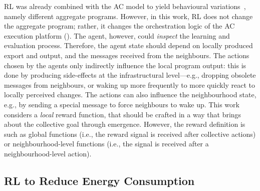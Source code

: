 \ac{RL} was already combined with the \ac{AC} model 
 to yield behavioural variations~\cite{DBLP:conf/acsos/Aguzzi21}, namely different aggregate programs.
%
However, in this work, \ac{RL} does not change the aggregate program; 
 rather, it changes the orchestration logic of the \ac{AC} execution platform (). 
%
The agent, however, could \emph{inspect} the learning and evaluation process. 
 Therefore, the agent state should depend on locally produced export and output, 
 and the messages received from the neighbours.
%
The actions chosen by the agents only indirectly influence the local program output: 
 this is done by producing side-effects at the infrastructural level---e.g., 
 dropping obsolete messages from neighbours, 
 or waking up more frequently to more quickly 
 react to locally perceived changes.
%
The actions can also influence the neighbourhood state, e.g., by sending a special message to force neighbours to wake up.
%
This work considers a \emph{local} reward function, that should be crafted in a way that brings about the collective goal through emergence. 
%
However, the reward definition is   
such as global functions (i.e., the reward signal is received after collective actions) or neighbourhood-level functions (i.e., the signal is received after a neighbourhood-level action).

\subsection{\acl{RL} to Reduce Energy Consumption}\label{acrl-energy-goal}


